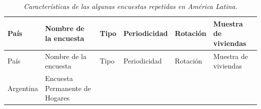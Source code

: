 \begin{longtable}[]{@{}llllll@{}}
\caption{\emph{Características de las algunas encuestas repetidas en América Latina.}}\tabularnewline
\toprule
\begin{minipage}[b]{0.13\columnwidth}\raggedright
País\strut
\end{minipage} & \begin{minipage}[b]{0.38\columnwidth}\raggedright
Nombre de la encuesta\strut
\end{minipage} & \begin{minipage}[b]{0.06\columnwidth}\raggedright
Tipo\strut
\end{minipage} & \begin{minipage}[b]{0.08\columnwidth}\raggedright
Periodicidad\strut
\end{minipage} & \begin{minipage}[b]{0.06\columnwidth}\raggedright
Rotación\strut
\end{minipage} & \begin{minipage}[b]{0.13\columnwidth}\raggedright
Muestra de viviendas\strut
\end{minipage}\tabularnewline
\midrule
\endfirsthead
\toprule
\begin{minipage}[b]{0.13\columnwidth}\raggedright
País\strut
\end{minipage} & \begin{minipage}[b]{0.38\columnwidth}\raggedright
Nombre de la encuesta\strut
\end{minipage} & \begin{minipage}[b]{0.06\columnwidth}\raggedright
Tipo\strut
\end{minipage} & \begin{minipage}[b]{0.08\columnwidth}\raggedright
Periodicidad\strut
\end{minipage} & \begin{minipage}[b]{0.06\columnwidth}\raggedright
Rotación\strut
\end{minipage} & \begin{minipage}[b]{0.13\columnwidth}\raggedright
Muestra de viviendas\strut
\end{minipage}\tabularnewline
\midrule
\endhead
\begin{minipage}[t]{0.13\columnwidth}\raggedright
Argentina\strut
\end{minipage} & \begin{minipage}[t]{0.38\columnwidth}\raggedright
Encuesta Permanente de Hogares\strut
\end{minipage} & \begin{minipage}[t]{0.06\columnwidth}\raggedright

\end{minipage}
\end{longtable}
